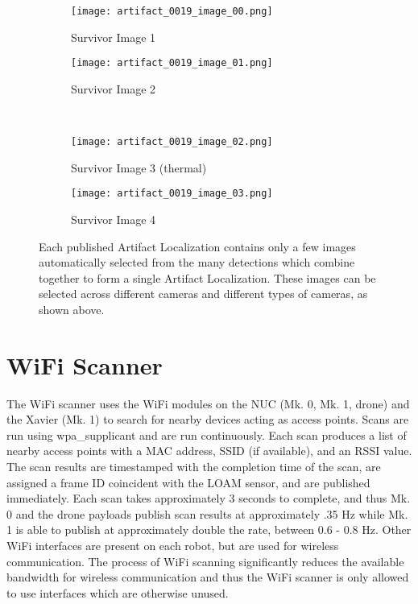 \begin{figure}
	\centering
	\begin{subfigure}{0.45\textwidth}
		\texttt{[image: artifact\_0019\_image\_00.png]}
		\caption{Survivor Image 1}
		\label{survivor_image_1}
	\end{subfigure}		
	\hfill
	\begin{subfigure}{0.45\textwidth}
		\texttt{[image: artifact\_0019\_image\_01.png]}
		\caption{Survivor Image 2}
		\label{survivor_image_2}
	\end{subfigure}
	\\
	\begin{subfigure}{0.45\textwidth}
		\texttt{[image: artifact\_0019\_image\_02.png]}
		\caption{Survivor Image 3 (thermal)}
		\label{survivor_image_3}
	\end{subfigure}
	\hfill
	\begin{subfigure}{0.45\textwidth}
		\texttt{[image: artifact\_0019\_image\_03.png]}
		\caption{Survivor Image 4}
		\label{survivor_image_4}
	\end{subfigure}		
	\caption[Automatically selected images from Artifact Localizations]{Each published Artifact Localization contains only a few images automatically selected from the many detections which combine together to form a single Artifact Localization. These images can be selected across different cameras and different types of cameras, as shown above.}
	\label{automatically_selected_images}
\end{figure}

\section{WiFi Scanner}

The WiFi scanner uses the WiFi modules on the NUC (Mk. 0, Mk. 1, drone) and the Xavier (Mk. 1) to search for nearby devices acting as access points. Scans are run using wpa\_supplicant and are run continuously. Each scan produces a list of nearby access points with a MAC address, SSID (if available), and an RSSI value. The scan results are timestamped with the completion time of the scan, are assigned a frame ID coincident with the LOAM sensor, and are published immediately. Each scan takes approximately 3 seconds to complete, and thus Mk. 0 and the drone payloads publish scan results at approximately .35 Hz while Mk. 1 is able to publish at approximately double the rate, between 0.6 - 0.8 Hz. Other WiFi interfaces are present on each robot, but are used for wireless communication. The process of WiFi scanning significantly reduces the available bandwidth for wireless communication and thus the WiFi scanner is only allowed to use interfaces which are otherwise unused.


